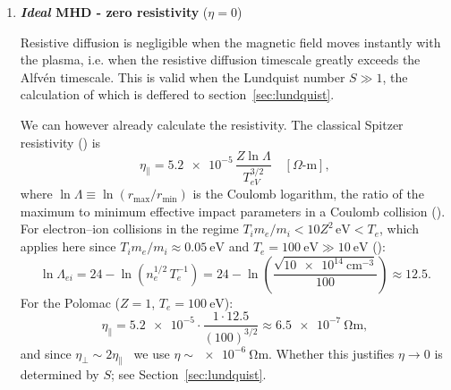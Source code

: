 \begin{enumerate}
The screened (Yukawa) potential around any 
test charge takes the form $\Phi(r) \propto r^{-1}\exp(-r/\lambda_D)$ 
(\cite{epfl_plasma_intro}), so for $r \gg \lambda_D$ the exponential suppresses 
$\Phi$ and therefore $e\Phi/k_B T_e \to 0$. If the plasma length scale $L$ satisfies 
$L \gg \lambda_D$, charge separation is exponentially suppressed throughout the 
bulk.

We conclude that quasi-neutrality requires
\[
    \frac{L}{\lambda_D} \gg 1, \qquad
    N_D = n\cdot\tfrac{4\pi}{3}\lambda_D^3 \gg 1.
\]

For the Polomac (\cite{Elio2024}), with $n=\SI{e20}{\meter^{-3}}$,
$k_B T_e=\SI{100}{\electronvolt}$ and the approxiamtive formula below for $\lambda_D$ given by \cite{Chen2016}:
\begin{itemize}
    \item $\lambda_D
          = \SI{7430}{\meter}\,\sqrt{T_\text{eV}/n}
          = 7430\sqrt{100/10^{20}}
          = \SI{7.4e-6}{\meter}$
    \item $L/\lambda_D
          \geq \SI{0.04}{\meter}/\SI{7.4e-6}{\meter}
          \approx \num{5.4e3} \gg 1$
    \item $N_D
          = \SI{e20}{\per\cubic\meter}\cdot\tfrac{4\pi}{3}(\SI{7.4e-6}{\meter})^3
          \approx \num{1.7e5} \gg 1$
\end{itemize}
Both conditions are well satisfied.


\item \textbf{\emph{Ideal} MHD - zero resistivity} ($\eta = 0$)

Resistive diffusion is negligible when the magnetic field moves instantly with the plasma,
 i.e. when the resistive diffusion timescale greatly exceeds
the Alfvén timescale. This is valid when the Lundquist number
$S \gg 1$, the calculation of which is deffered to section~\ref{sec:lundquist}.

We can however already calculate the resistivity.
The classical Spitzer resistivity (\cite{Chen2016}) is
\[
    \eta_\parallel
    = \num{5.2e-5}\,\frac{Z\ln\Lambda}{T_{eV}^{3/2}}
    \quad[\Omega\text{-m}],
\]
where $\ln\Lambda \equiv \ln(r_\text{max}/r_\text{min})$ is the Coulomb
logarithm, the ratio of the maximum to minimum effective impact
parameters in a Coulomb collision (\cite{NRL2023}). For electron--ion
collisions in the regime $T_i m_e/m_i < 10Z^2\,\text{eV} < T_e$,
which applies here since $T_i m_e/m_i \approx \SI{0.05}{\electronvolt}$ and
$T_e = \SI{100}{\electronvolt} \gg \SI{10}{\electronvolt}$ (\cite{NRL2023}):
\[
    \ln\Lambda_{ei}
    = 24 - \ln\!\left(n_e^{1/2}\,T_e^{-1}\right)
    = 24 - \ln\!\left(\frac{\sqrt{\SI{10e14}{\centi\meter^{-3}}}}{100}\right)   
    \approx 12.5.
\]
For the Polomac ($Z=1$, $T_e = \SI{100}{\electronvolt}$):
\[
    \eta_\parallel
    = \num{5.2e-5}\cdot\frac{1\cdot 12.5}{(100)^{3/2}}
    \approx \SI{6.5e-7}{\ohm\meter},
\]
and since $\eta_\perp \sim 2\eta_\parallel$~\cite{Chen2016} we use
$\eta \sim \SI{e-6}{\ohm\meter}$. Whether this justifies $\eta\to 0$
is determined by $S$; see Section~\ref{sec:lundquist}.




\end{enumerate}
